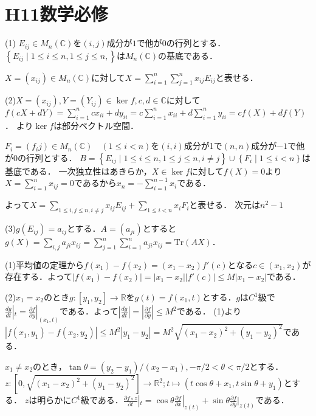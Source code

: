 \documentclass[
		book,
		head_space=20mm,
		foot_space=20mm,
		gutter=10mm,
		line_length=190mm
]{jlreq}
\begin{document}
\section{H11数学必修}
(1) $E_{ij}\in M_n(\mathbb{C})$を$(i,j)$成分が$1$で他が$0$の行列とする．
$\left\{ E_{ij} \mid 1\le i\le n, 1\le j\le n, \right\}$は$M_n(\mathbb{C})$の基底である．

$X=(x_{ij})\in M_n(\mathbb{C})$に対して$X=\sum_{i=1}^n \sum_{j=1}^n x_{ij}E_{ij}$と表せる．

(2)$X=(x_{ij}),Y=(Y_{ij}) \in \ker f,c,d\in \mathbb{C}$に対して
$f(cX+dY)=\sum_{i=1}^n cx_{ii} + dy_{ii}=c\sum_{i=1}^n x_{ii} + d\sum_{i=1}^n y_{ii}=cf(X)+df(Y)$．
より$\ker f$は部分ベクトル空間．

$F_i=(f_ij)\in M_n(\mathbb{C})\quad(1\le i <n)$を$(i,i)$成分が1で$(n,n)$成分が$-1$で他が$0$の行列とする．
$B=\left\{ E_{ij} \mid 1\le i\le n, 1\le j\le n, i\neq j \right\}\cup \left\{ F_i \mid 1\le i <n \right\}$は基底である．
一次独立性はあきらか，$X\in \ker f$に対して$f(X)=0$より$X=\sum_{i=1}^nx_{ij}=0$であるから$x_n=-\sum_{i=1}^{n-1}x_i$である．

よって$X=\sum\limits_{1\le i,j \le n, i\neq j} x_{ij}E_{ij} + \sum\limits_{1\le i < n} x_iF_i$と表せる．
次元は$n^2-1$

(3)$g(E_{ij})=a_{ij}$とする．$A=(a_{ji})$とすると
$g(X)=\sum\limits_{i,j}a_{ji}x_{ij}=\sum\limits_{j=1}^n \sum\limits_{i=1}^n a_{ji}x_{ij}=\mathrm{Tr}(AX)$．

(1)平均値の定理から$f(x_1)-f(x_2)=(x_1-x_2)f'(c)$となる$c\in (x_1,x_2)$が存在する．よって$|f(x_1)-f(x_2)|=|x_1-x_2||f'(c)|\le M|x_1-x_2|$である．

(2)$x_1=x_2$のとき$g\colon [y_1,y_2]\rightarrow \mathbb{R}$を$g(t)=f(x_1,t)$とする．$g$は$C^1$級で$\frac{dg}{dt}|_t=\frac{\partial f}{\partial y}|_{(x_1,t)}$である．よって$|\frac{dg}{dt}|=|\frac{\partial f}{\partial y}| \le M^2$である．
(1)より$|f(x_1,y_1)-f(x_2,y_2)|\le M^2|y_1-y_2|=M^2\sqrt{(x_1-x_2)^2+(y_1-y_2)^2}$である．

$x_1\neq x_2$のとき，$\tan\theta=(y_2-y_1)/(x_2-x_1),-\pi/2<\theta < \pi/2$とする．$z\colon [0,\sqrt{(x_1-x_2)^2+(y_1-y_2)^2}]\rightarrow \mathbb{R}^2;t \mapsto (t\cos \theta+x_1,t\sin \theta+y_1)$とする．
$z$は明らかに$C^1$級である．$\frac{\partial f\circ z}{\partial t}|_t=\cos \theta\frac{\partial f}{\partial x}|_{z(t)}+\sin \theta\frac{\partial f}{\partial y}|_{z(t)}$である．
\end{document}
